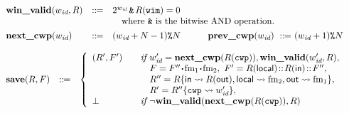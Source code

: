 \begin{figure}[!t]
\[\begin{array}{l}
        \begin{array}{lcl}
            \winvalid(\cwp, \RFile) & \define & 2^{\cwp}
                                            \,\bitAND\, \RFile(\regwim) = 0 \\
             & & \ \ \ \mbox{where $\bitAND$ is the bitwise AND operation.}
            \\
            \\[-8pt]
		    \precwp(\cwp) & \define & (\cwp + N - 1) \modOP N
            \qquad\quad
		    \postcwp(\cwp) \ \define \ (\cwp + 1) \modOP N
        \end{array}
            \\
		    \\ %
        \begin{array}{lcl}
            \decwin(\RFile, \Wstack) & \define &
            \left\{
            \begin{array}{ll}
                (\RFile', \Wstack')
                & \quad \textit{if }
                             \cwp' = \precwp(\RFile(\regcwp)),
                             \winvalid(\cwp', \RFile), \\
                & \quad \ \ \
                             \Wstack = \Wstack'' \lstApp \fm_1 \lstApp \fm_2, \
                              \Wstack' = \RFile(\localRN)
                                          \stCons\RFile(\inRN)\stCons\Wstack'',\\
                & \quad \ \ \ \RFile'' =
                \RFile\{\inRN\rightsquigarrow \RFile(\outRN),
                        \localRN\rightsquigarrow \fm_2,
                        \outRN \rightsquigarrow \fm_1\},
                \\
                 & \quad \ \ \
                            \RFile' = \fsubst{\RFile''}\regcwp{\cwp'},
                 \\
                \perp &\quad \textit{if }
                                  \lnot\winvalid(\precwp(R(\regcwp)), \RFile)
            \end{array}
            \right. \\
            \\
            \\[-8pt]


\end{array}
\end{array}\]
\end{figure}
